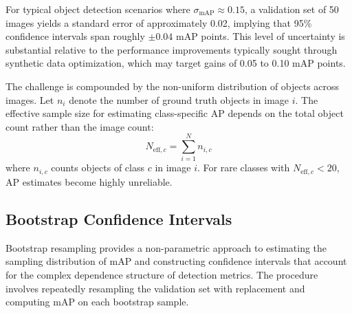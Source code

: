 For typical object detection scenarios where $\sigma_{\text{mAP}} \approx 0.15$, a validation set of 50 images yields a standard error of approximately 0.02, implying that 95\% confidence intervals span roughly $\pm 0.04$ mAP points. This level of uncertainty is substantial relative to the performance improvements typically sought through synthetic data optimization, which may target gains of 0.05 to 0.10 mAP points.

The challenge is compounded by the non-uniform distribution of objects across images. Let $n_i$ denote the number of ground truth objects in image $i$. The effective sample size for estimating class-specific AP depends on the total object count rather than the image count:
\begin{equation}
N_{\text{eff},c} = \sum_{i=1}^{N} n_{i,c}
\label{eq:effective_sample_size}
\end{equation}
where $n_{i,c}$ counts objects of class $c$ in image $i$. For rare classes with $N_{\text{eff},c} < 20$, AP estimates become highly unreliable.

\subsection{Bootstrap Confidence Intervals}

Bootstrap resampling provides a non-parametric approach to estimating the sampling distribution of mAP and constructing confidence intervals that account for the complex dependence structure of detection metrics. The procedure involves repeatedly resampling the validation set with replacement and computing mAP on each bootstrap sample.

